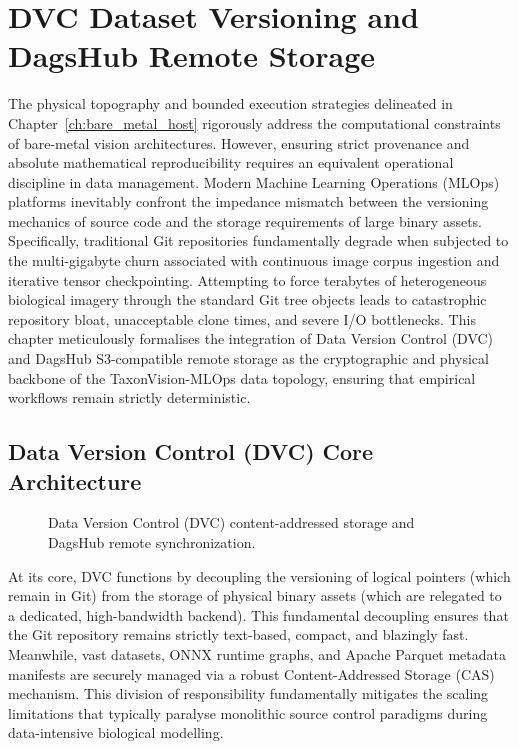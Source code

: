 \chapter{DVC Dataset Versioning and DagsHub Remote Storage}
\label{ch:dvc_dagshub_storage}

The physical topography and bounded execution strategies delineated in Chapter~\ref{ch:bare_metal_host} rigorously address the computational constraints of bare-metal vision architectures. However, ensuring strict provenance and absolute mathematical reproducibility requires an equivalent operational discipline in data management. Modern Machine Learning Operations (MLOps) platforms inevitably confront the impedance mismatch between the versioning mechanics of source code and the storage requirements of large binary assets. Specifically, traditional Git repositories fundamentally degrade when subjected to the multi-gigabyte churn associated with continuous image corpus ingestion and iterative tensor checkpointing. Attempting to force terabytes of heterogeneous biological imagery through the standard Git tree objects leads to catastrophic repository bloat, unacceptable clone times, and severe I/O bottlenecks. This chapter meticulously formalises the integration of Data Version Control (DVC) and DagsHub S3-compatible remote storage as the cryptographic and physical backbone of the TaxonVision-MLOps data topology, ensuring that empirical workflows remain strictly deterministic.

\section{Data Version Control (DVC) Core Architecture}
\label{sec:dvc_core_architecture}

\begin{figure}[htbp]
\centering

\caption{Data Version Control (DVC) content-addressed storage and DagsHub remote synchronization.}
\label{fig:dvc_dataset_versioning}
\end{figure}

At its core, DVC functions by decoupling the versioning of logical pointers (which remain in Git) from the storage of physical binary assets (which are relegated to a dedicated, high-bandwidth backend). This fundamental decoupling ensures that the Git repository remains strictly text-based, compact, and blazingly fast. Meanwhile, vast datasets, ONNX runtime graphs, and Apache Parquet metadata manifests are securely managed via a robust Content-Addressed Storage (CAS) mechanism. This division of responsibility fundamentally mitigates the scaling limitations that typically paralyse monolithic source control paradigms during data-intensive biological modelling.

